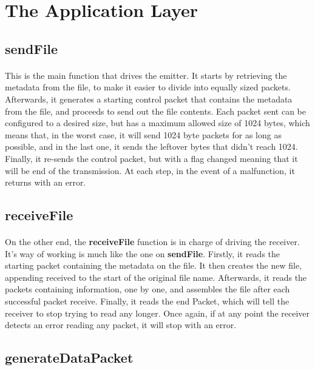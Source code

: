 \documentclass[11pt]{article}
\begin{document}
\section{The Application Layer}

\subsection*{sendFile}

\paragraph{}This is the main function that drives the emitter. It starts by retrieving the metadata from the
file, to make it easier to divide into equally sized packets. Afterwards, it generates a starting control
packet that contains the metadata from the file, and proceeds to send out the file contents. Each packet
sent can be configured to a desired size, but has a maximum allowed size of 1024 bytes, which means that, in
the worst case, it will send 1024 byte packets for as long as possible, and in the last one, it sends the
leftover bytes that didn't reach 1024. Finally, it re-sends the control packet, but with a flag changed
meaning that it will be end of the transmission. At each step, in the event of a malfunction, it returns
with an error.

\subsection*{receiveFile}

\paragraph{}On the other end, the \textbf{receiveFile} function is in charge of driving the receiver. It's
way of working is much like the one on \textbf{sendFile}. Firstly, it reads the starting packet containing
the metadata on the file. It then creates the new file, appending received to the start of the original
file name. Afterwards, it reads the packets containing information, one by one, and assembles the file after
each successful packet receive. Finally, it reads the end Packet, which will tell the receiver to stop
trying to read any longer. Once again, if at any point the receiver detects an error reading any packet, it
will stop with an error.

\subsection*{generateDataPacket}
\end{document}
